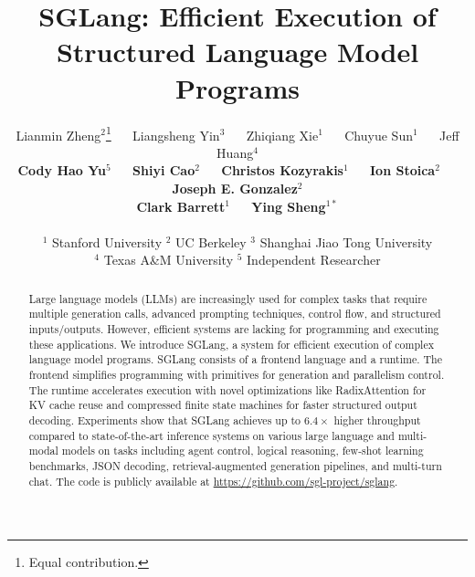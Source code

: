 \documentclass{article}
\title{SGLang: Efficient Execution of \\ Structured Language Model Programs}
\author{
Lianmin Zheng$^2$\thanks{Equal contribution.} $\quad$ Liangsheng Yin$^3$ $\quad$ Zhiqiang Xie$^1$ $\quad$ Chuyue Sun$^1$ $\quad$ Jeff Huang$^4$ \\
\textbf{Cody Hao Yu}$^5$ $\quad$ \textbf{Shiyi Cao}$^2$ $\quad$ \textbf{Christos Kozyrakis}$^1$ $\quad$ \textbf{Ion Stoica}$^2$ $\quad$ \textbf{Joseph E. Gonzalez}$^2$ \\
\textbf{Clark Barrett}$^1$ $\quad$ \textbf{Ying Sheng}$^{1*}$ \\\\
$^1$ Stanford University \quad $^2$ UC Berkeley \quad $^3$ Shanghai Jiao Tong University \\
\quad $^4$ Texas A\&M University \quad $^5$ Independent Researcher
}
\theoremstyle{plain}
\theoremstyle{definition}
\theoremstyle{remark}
\newcommand{\lang}[0]{SGLang\xspace}
\begin{document}
\maketitle

\begin{abstract}
Large language models (LLMs) are increasingly used for complex tasks that require multiple generation calls, advanced prompting techniques, control flow, and structured inputs/outputs. However, efficient systems are lacking for programming and executing these applications. We introduce \lang, a system for efficient execution of complex language model programs. \lang consists of a frontend language and a runtime. The frontend simplifies programming with primitives for generation and parallelism control. The runtime accelerates execution with novel optimizations like RadixAttention for KV cache reuse and compressed finite state machines for faster structured output decoding. Experiments show that \lang achieves up to $6.4\times$ higher throughput compared to state-of-the-art inference systems on various large language and multi-modal models on tasks including agent control, logical reasoning, few-shot learning benchmarks, JSON decoding, retrieval-augmented generation pipelines, and multi-turn chat. The code is publicly available at \url{https://github.com/sgl-project/sglang}.
\end{abstract}















\newpage
\appendix

\end{document}
